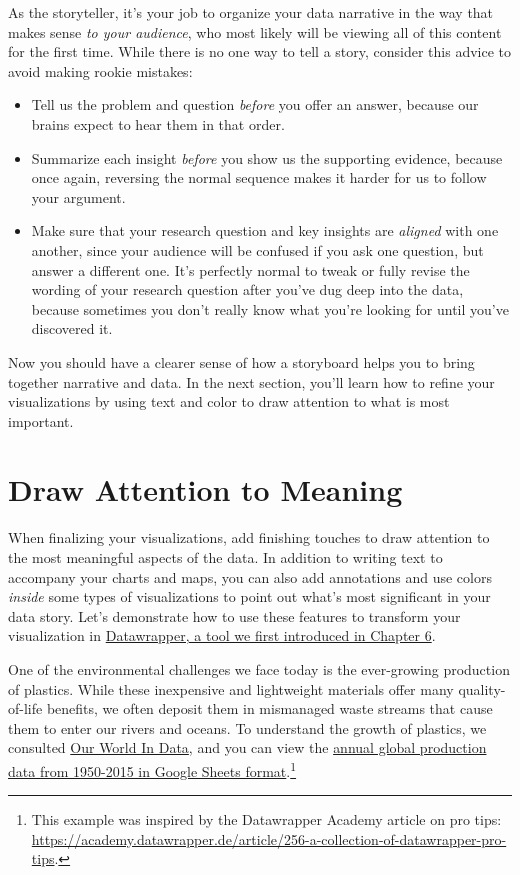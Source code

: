\documentclass[
  english,
]{book}
\providecommand{\tightlist}{%
  \setlength{\itemsep}{0pt}\setlength{\parskip}{0pt}}
\begin{document}
As the storyteller, it's your job to organize your data narrative in the way that makes sense \emph{to your audience}, who most likely will be viewing all of this content for the first time. While there is no one way to tell a story, consider this advice to avoid making rookie mistakes:

\begin{itemize}
\tightlist
\item
  Tell us the problem and question \emph{before} you offer an answer, because our brains expect to hear them in that order.
\item
  Summarize each insight \emph{before} you show us the supporting evidence, because once again, reversing the normal sequence makes it harder for us to follow your argument.
\item
  Make sure that your research question and key insights are \emph{aligned} with one another, since your audience will be confused if you ask one question, but answer a different one. It's perfectly normal to tweak or fully revise the wording of your research question after you've dug deep into the data, because sometimes you don't really know what you're looking for until you've discovered it.
\end{itemize}

Now you should have a clearer sense of how a storyboard helps you to bring together narrative and data. In the next section, you'll learn how to refine your visualizations by using text and color to draw attention to what is most important.

\hypertarget{draw-attention}{%
\section*{Draw Attention to Meaning}\label{draw-attention}}

When finalizing your visualizations, add finishing touches to draw attention to the most meaningful aspects of the data. In addition to writing text to accompany your charts and maps, you can also add annotations and use colors \emph{inside} some types of visualizations to point out what's most significant in your data story. Let's demonstrate how to use these features to transform your visualization in \href{chart-datawrapper.html}{Datawrapper, a tool we first introduced in Chapter 6}.

One of the environmental challenges we face today is the ever-growing production of plastics. While these inexpensive and lightweight materials offer many quality-of-life benefits, we often deposit them in mismanaged waste streams that cause them to enter our rivers and oceans. To understand the growth of plastics, we consulted \href{https://ourworldindata.org/plastic-pollution}{Our World In Data}, and you can view the \href{https://docs.google.com/spreadsheets/d/1H3OwmiLQy5DugT-iArhuqHryzcWJi1kLocpGp7v-1VM/edit\#gid=339613035}{annual global production data from 1950-2015 in Google Sheets format}.\footnote{This example was inspired by the Datawrapper Academy article on pro tips: \url{https://academy.datawrapper.de/article/256-a-collection-of-datawrapper-pro-tips}.}
\end{document}
